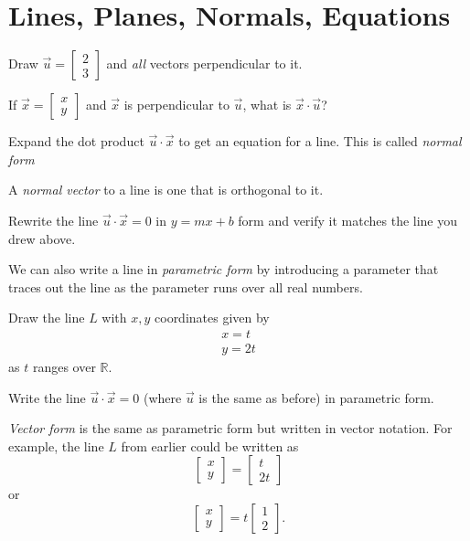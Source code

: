 \documentclass[letter]{article}
\newcommand{\R}{\mathbb{R}}
\begin{document}
\newpage
\section*{Lines, Planes, Normals, Equations}
	\begin{Enum}
		\item Draw $\vec u=\begin{bmatrix}2\\3\end{bmatrix}$ and \emph{all}
		vectors perpendicular to it.
		\item If $\vec x=\begin{bmatrix}x\\y\end{bmatrix}$ and $\vec x$ is 
		perpendicular to $\vec u$, what is $\vec x\cdot \vec u$?
		\item Expand the dot product $\vec u\cdot \vec x$ to get an equation
		for a line.  This is called \emph{normal form}
	\end{Enum}

	A \emph{normal vector} to a line is one that is orthogonal to it.
	\begin{Enum}[resume]
		\item Rewrite the line $\vec u\cdot \vec x = 0$ in $y=mx+b$ form and verify it matches
		the line you drew above.
	\end{Enum}

	We can also write a line in \emph{parametric form} by introducing a parameter
	that traces out the line as the parameter runs over all real numbers.
	\begin{Enum}
		\item Draw the line $L$ with $x,y$ coordinates given by
		\[
			\begin{array}{l}x=t\\y=2t\end{array}
		\]
		as $t$ ranges over $\R$.
		\item Write the line $\vec u \cdot \vec x=0$ (where $\vec u$ is the same as before) in parametric form.
	\end{Enum}
	
	\emph{Vector form} is the same as parametric form but written in vector notation.  For example, the
	line $L$ from earlier could be written as 
	\[
		\begin{bmatrix}x\\y\end{bmatrix}=\begin{bmatrix}t\\2t\end{bmatrix}
	\]
	or
	\[
		\begin{bmatrix}x\\y\end{bmatrix}=t\begin{bmatrix}1\\2\end{bmatrix}.
	\]
\end{document}
